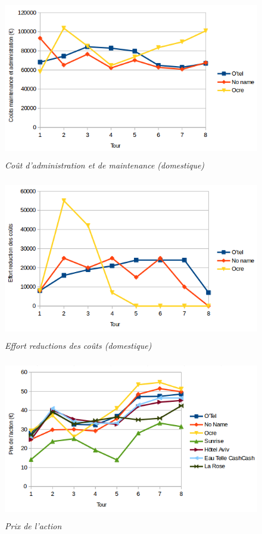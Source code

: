 \documentclass[a4paper,10pt]{article}
\begin{document}
    \begin{figure}[!ht]
      \begin{center}
	\includegraphics[height=7cm,keepaspectratio]{./images/cout_administration_et_maintenance.png}
      \end{center}
      \caption{\textit{Coût d'administration et de maintenance (domestique)}}
    \end{figure}

    
    \begin{figure}[!ht]
      \begin{center}
	\includegraphics[height=7cm,keepaspectratio]{./images/effort_reduction_couts.png}
      \end{center}
      \caption{\textit{Effort reductions des coûts (domestique)}}
    \end{figure}
    
    \begin{figure}[!ht]
      \begin{center}
	\includegraphics[height=7cm,keepaspectratio]{./images/action.png}
      \end{center}
      \caption{\textit{Prix de l'action}}
    \end{figure}
        
\end{document}
